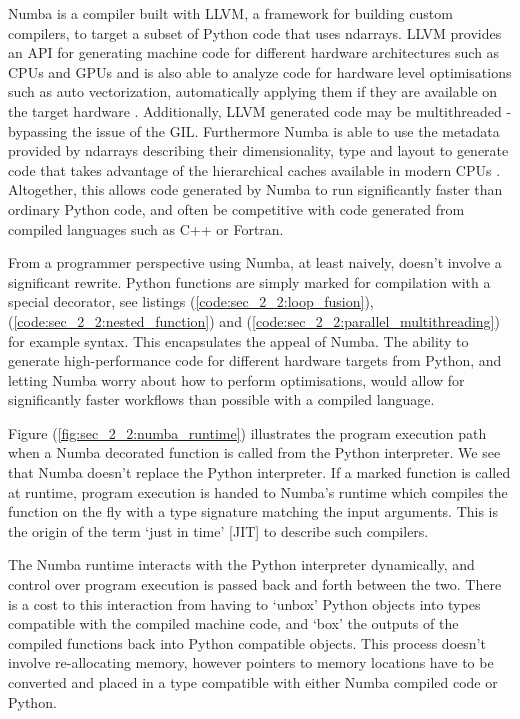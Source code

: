 Numba is a compiler built with LLVM, a framework for building custom compilers, to target a subset of Python code that uses ndarrays. LLVM provides an API for generating machine code for different hardware architectures such as CPUs and GPUs and is also able to analyze code for hardware level optimisations such as auto vectorization, automatically applying them if they are available on the target hardware \cite{lattner2004llvm}. Additionally, LLVM generated code may be multithreaded - bypassing the issue of the GIL. Furthermore Numba is able to use the metadata provided by ndarrays describing their dimensionality, type and layout to generate code that takes advantage of the hierarchical caches available in modern CPUs \cite{lam2015numba}. Altogether, this allows code generated by Numba to run significantly faster than ordinary Python code, and often be competitive with code generated from compiled languages such as C++ or Fortran. 

From a programmer perspective using Numba, at least naively, doesn't involve a significant rewrite. Python functions are simply marked for compilation with a special decorator, see listings (\ref{code:sec_2_2:loop_fusion}), (\ref{code:sec_2_2:nested_function}) and (\ref{code:sec_2_2:parallel_multithreading}) for example syntax. This encapsulates the appeal of Numba. The ability to generate high-performance code for different hardware targets from Python, and letting Numba worry about how to perform optimisations, would allow for significantly faster workflows than possible with a compiled language.

Figure (\ref{fig:sec_2_2:numba_runtime}) illustrates the program execution path when a Numba decorated function is called from the Python interpreter. We see that Numba doesn't replace the Python interpreter. If a marked function is called at runtime, program execution is handed to Numba's runtime which compiles the function on the fly with a type signature matching the input arguments. This is the origin of the term `just in time' [JIT] to describe such compilers.

The Numba runtime interacts with the Python interpreter dynamically, and control over program execution is passed back and forth between the two. There is a cost to this interaction from having to `unbox' Python objects into types compatible with the compiled machine code, and `box' the outputs of the compiled functions back into Python compatible objects. This process doesn't involve re-allocating memory, however pointers to memory locations have to be converted and placed in a type compatible with either Numba compiled code or Python.

